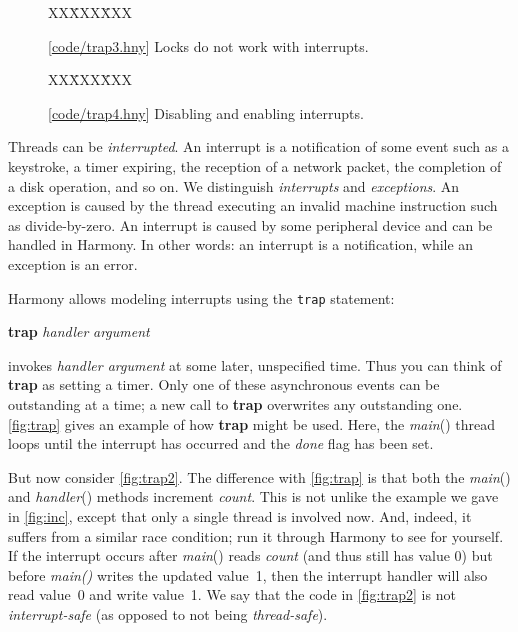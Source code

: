 \documentclass{report}
\newcommand{\harmonysource}[1]{
\begin{tabbing}
XX\=XXX\=XXX\kill
    
\end{tabbing}
}
\newcommand{\harmonylink}[1]{%
[\href{https://harmony.cs.cornell.edu/#1}{\underline{#1}}]%
}
\newenvironment{code}{
\tcolorbox
}{
\endtcolorbox
}
\begin{document}
\begin{figure}
\begin{code}
\harmonysource{trap3}
\end{code}
\caption{\harmonylink{code/trap3.hny} Locks do not work with interrupts.}
\label{fig:trap3}
\end{figure}

\begin{figure}
\begin{code}
\harmonysource{trap4}
\end{code}
\caption{\harmonylink{code/trap4.hny} Disabling and enabling interrupts.}
\label{fig:trap4}
\end{figure}

Threads can be \emph{interrupted}.  An interrupt is a notification
of some event such as a keystroke, a timer expiring, the reception
of a network packet, the completion of a disk operation, and so on.
We distinguish \emph{interrupts} and \emph{exceptions}.  An exception
is caused by the thread executing an invalid machine instruction
such as divide-by-zero.  An interrupt is caused by some peripheral
device and can be handled in Harmony.  In other words: an interrupt
is a notification, while an exception is an error.  

Harmony allows modeling interrupts using the \texttt{trap} statement:
\begin{code}
\textbf{trap} \textit{handler} \textit{argument}
\end{code}
invokes \textit{handler argument} at some later, unspecified time.
Thus you can think of \textbf{trap} as setting a timer.
Only one of these asynchronous events can be outstanding at a time;
a new call to \textbf{trap} overwrites any outstanding one.
\autoref{fig:trap} gives an example of how \textbf{trap} might be used.
Here, the \textit{main}() thread loops until the interrupt has occurred and
the \textit{done} flag has been set.

But now consider \autoref{fig:trap2}.  The difference with \autoref{fig:trap} is
that both the \textit{main}() and \textit{handler}() methods increment \textit{count}.
This is not unlike the example we gave in \autoref{fig:inc}, except that only a single
thread is involved now.  And, indeed, it suffers from a similar race condition; run
it through Harmony to see for yourself.  If the interrupt occurs after \textit{main}()
reads \textit{count} (and thus still has value 0) but before \textit{main()} writes the
updated value~1, then the interrupt handler will also read value~0 and write value~1.
We say that the code in \autoref{fig:trap2} is not \textit{interrupt-safe} (as opposed
to not being \textit{thread-safe}).
\end{document}
